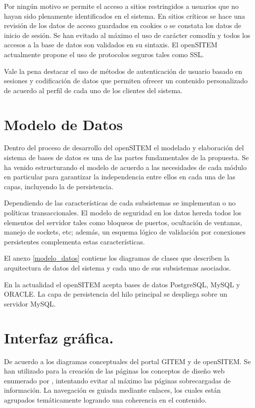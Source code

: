 Por ningún motivo se permite el acceso a sitios restringidos a usuarios que no hayan sido plenamente identificados en el sistema. En sitios críticos se hace una revisión de los datos de acceso guardados en cookies o se constata los datos de inicio de sesión. Se han evitado al máximo el uso de carácter comodín y todos los accesos a la base de datos son validados en su sintaxis. El openSITEM actualmente propone el uso de protocolos seguros tales como SSL.

Vale la pena destacar el uso de métodos de autenticación de usuario basado en sesiones y codificación de datos que permiten ofrecer un contenido personalizado de acuerdo al perfil de cada uno de los clientes del sistema.


\section{Modelo de Datos}

Dentro del proceso de desarrollo del openSITEM el modelado y elaboración del sistema de bases de datos es una de las partes fundamentales de la propuesta. Se ha venido estructurando el modelo de acuerdo a las necesidades de cada módulo en particular para garantizar la independencia entre ellos en cada una de las capas, incluyendo la de persistencia.

Dependiendo de las características de cada subsistemas se implementan o no políticas transaccionales. El modelo de seguridad en los datos hereda todos los elementos del servidor tales como bloqueos de puertos, ocultación de ventanas, manejo de sockets, etc; además, un esquema lógico de validación por conexiones persistentes complementa estas características.

El anexo \ref{modelo_datos} contiene los diagramas de clases que describen la arquitectura de datos del sistema y cada uno de sus subsistemas asociados. 

En la actualidad el openSITEM acepta bases de datos PostgreSQL, MySQL y ORACLE. La capa de persistencia del hilo principal se despliega sobre un servidor MySQL.


\section{Interfaz gráfica.}

De acuerdo a los diagramas conceptuales del portal GITEM y de openSITEM. Se han utilizado para la creación de las páginas los conceptos de diseño web enumerado por \cite{krug2014}, intentando evitar al máximo las páginas sobrecargadas de información. La navegación es guiada mediante enlaces, los cuales están agrupados temáticamente logrando una coherencia en el contenido. 


